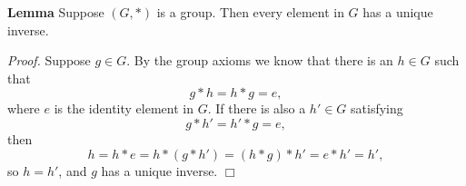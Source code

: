 \documentclass[12pt]{article}
\begin{document}

{\bf Lemma}
Suppose $(G,\ast)$ is a group. Then every element in $G$ has a
unique inverse.

\emph{Proof.} Suppose $g\in G$. By the group axioms we know that there
is an $h\in G$ such that 
$$ g\ast h = h\ast g = e,$$
where $e$ is the identity element in $G$. If there is also a $h'\in G$
satisfying
$$ g\ast h' = h'\ast g = e,$$
then 
$$ h = h\ast e = h \ast(g \ast h') =(h\ast g)\ast h' = e\ast h' = h',$$
so $h=h'$, and $g$ has a unique inverse. $\Box$
\end{document}
